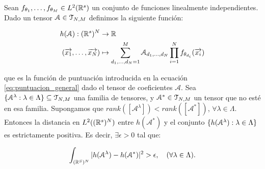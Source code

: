 \begin{lema} \label{lema:lema_previo_corolario}
    Sean $f_{\theta_1}, \ldots, f_{\theta_M} \in L^2(\mathbb{R}^s)$ un conjunto de funciones linealmente independientes. Dado un tensor $\mathcal{A} \in \mathcal{T}_{N, M}$ definimos la siguiente función:

    \begin{equation}
        \begin{split}
            h(\mathcal{A}): (\mathbb{R}^s)^N &\to \mathbb{R} \\
            (\overrightarrow{x_1}, \ldots, \overrightarrow{x_N}) &\mapsto \sum_{d_1, \ldots, d_N = 1}^M \mathcal{A}_{d_1, \ldots, d_N} \prod_{i = 1}^N f_{\theta_{d_i}}(\overrightarrow{x_i})
        \end{split}
    \end{equation}

    que es la función de puntuación introducida en la ecuación \eqref{eq:puntuacion_general} dado el tensor de coeficientes $\mathcal{A}$. Sea $\{ \mathcal{A}^\lambda: \lambda \in \Lambda \} \subseteq \mathcal{T}_{N, M}$ una familia de tensores, y $\mathcal{A}^* \in \mathcal{T}_{N, M}$ un tensor que no esté en esa familia. Supongamos que $rank([\mathcal{A}^\lambda]) < rank([\mathcal{A}^*])$, $\forall \lambda \in \Lambda$. Entonces la distancia en $L^2((\mathbb{R}^s)^N)$ entre $h(\mathcal{A}^*)$ y el conjunto $\{ h(\mathcal{A}^\lambda): \lambda \in \Lambda \}$ es estrictamente positiva. Es decir, $\exists \epsilon > 0$ tal que:

    \begin{equation}
        \int_{(\mathbb{R}^S)^N} |h(\mathcal{A}^\lambda) - h(\mathcal{A}^*)|^2 > \epsilon, \quad (\forall \lambda \in \Lambda).
    \end{equation}
\end{lema}

